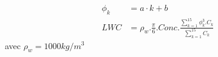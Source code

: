 \begin{align*}
\phi_k &= a \cdot k + b  \\
LWC &=  \rho_w .\frac{\pi}{6}. Conc .
\frac{\displaystyle\sum_{k=1}^{15} \phi_k^3.C_k} 
     {\displaystyle\sum_{k=1}^{15} C_k}
\end{align*}
avec $\rho_w = 1000 kg/m^3$
